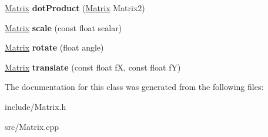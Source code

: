 \begin{DoxyCompactItemize}
\item 
\hypertarget{class_matrix_a803b37ab06316eb3ae0e03e01df41b4c}{}\hyperlink{class_matrix}{Matrix} {\bfseries dot\+Product} (\hyperlink{class_matrix}{Matrix} Matrix2)\label{class_matrix_a803b37ab06316eb3ae0e03e01df41b4c}

\item 
\hypertarget{class_matrix_a3c35859202574669da72c4814da49405}{}\hyperlink{class_matrix}{Matrix} {\bfseries scale} (const float scalar)\label{class_matrix_a3c35859202574669da72c4814da49405}

\item 
\hypertarget{class_matrix_acc9381ad9401ebacbdd3146852213a46}{}\hyperlink{class_matrix}{Matrix} {\bfseries rotate} (float angle)\label{class_matrix_acc9381ad9401ebacbdd3146852213a46}

\item 
\hypertarget{class_matrix_a2cce68a47598e7e27638da99442bca70}{}\hyperlink{class_matrix}{Matrix} {\bfseries translate} (const float f\+X, const float f\+Y)\label{class_matrix_a2cce68a47598e7e27638da99442bca70}

\end{DoxyCompactItemize}


The documentation for this class was generated from the following files\+:\begin{DoxyCompactItemize}
\item 
include/Matrix.\+h\item 
src/Matrix.\+cpp\end{DoxyCompactItemize}
